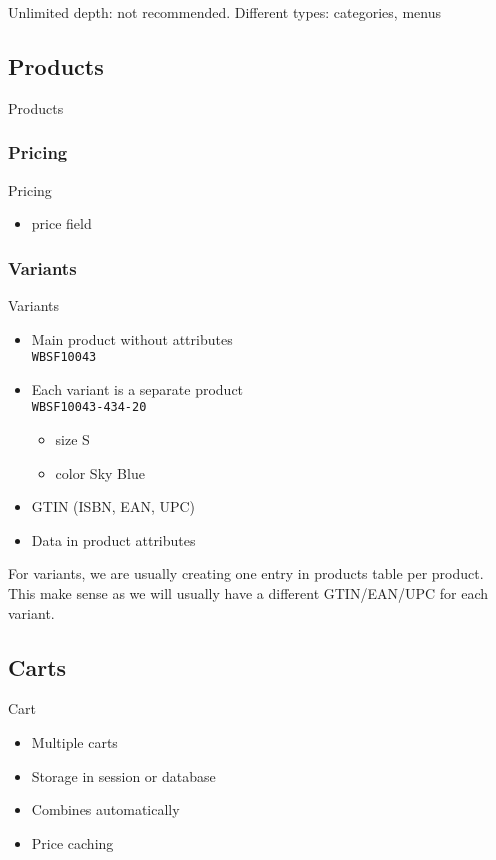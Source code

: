 Unlimited depth: not recommended.
Different types: categories, menus

\subsection{Products}
\begin{frame}{Products}
\end{frame}

\subsubsection{Pricing}
\begin{frame}{Pricing}
\begin{itemize}
\item price field
\end{itemize}
\end{frame}


\subsubsection{Variants}
\begin{frame}[fragile]{Variants}
\begin{itemize}
\item Main product without attributes \\
      \verb|WBSF10043|
\item Each variant is a separate product \\
      \verb|WBSF10043-434-20| 
\begin{itemize}
\item size S 
\item color Sky Blue
\end{itemize}
\item GTIN (ISBN, EAN, UPC)
\item Data in product attributes
\end{itemize}
\end{frame}

For variants, we are usually creating one entry in products table per
product. This make sense as we will usually have a different GTIN/EAN/UPC
for each variant.

\subsection{Carts}
\begin{frame}{Cart}
\begin{itemize}
\item Multiple carts
\item Storage in session or database
\item Combines automatically
\item Price caching
\end{itemize}
\end{frame}

